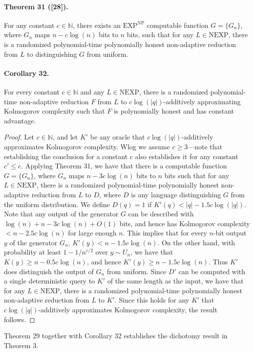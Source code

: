 \paragraph{Theorem 31 ([28]).} For any constant $c\in\mathbb N$, there exists an $\mathrm{EXP}^{\mathrm{NP}}$ computable function $G=\{G_n\}$, where $G_n$ maps $n-c\log(n)$ bits to $n$ bits, such that for any $L\in\mathrm{NEXP}$, there is a randomized polynomial-time polynomially honest non-adaptive reduction from $L$ to distinguishing $G$ from uniform.
\paragraph{Corollary 32.} For every constant $c\in\mathbb N$ and any $L\in\mathrm{NEXP}$, there is a randomized polynomial-time non-adaptive reduction $F$ from $L$ to $c\log(|q|)$-additively approximating Kolmogorov complexity such that $F$ is polynomially honest and has constant advantage.
\begin{proof}Let $c\in\mathbb N$, and let $K'$ be any oracle that $c\log(|q|)$-additively approximates Kolmogorov complexity. Wlog we assume $c\ge3$---note that establishing the conclusion for a constant $c$ also establishes it for any constant $c'\le c$. Applying Theorem 31, we have that there is a computable function $G=\{G_n\}$, where $G_n$ maps $n-3c\log(n)$ bits to $n$ bits such that for any $L\in\mathrm{NEXP}$, there is a randomized polynomial-time polynomially honest non-adaptive reduction from $L$ to $D$, where $D$ is any language distinguishing $G$ from the uniform distribution. We define $D(q)=1$ if $K'(q)<|q|-1.5c\log(|q|)$. Note that any output of the generator $G$ can be described with $\log(n)+n-3c\log(n)+O(1)$ bits, and hence has Kolmogorov complexity $<n-2.5c\log(n)$ for large enough $n$. This implies that for every $n$-bit output $y$ of the generator $G_n$, $K'(y)<n-1.5c\log(n)$. On the other hand, with probability at least $1-1/n^{c/2}$ over $y\sim U_n$, we have that $K(y)\ge n-0.5c\log(n)$, and hence $K'(y)\ge n-1.5c\log(n)$. Thus $K'$ does distinguish the output of $G_n$ from uniform. Since $D'$ can be computed with a single deterministic query to $K'$ of the same length as the input, we have that for any $L\in\mathrm{NEXP}$, there is a randomized polynomial-time polynomially honest non-adaptive reduction from $L$ to $K'$. Since this holds for any $K'$ that $c\log(|q|)$-additively approximates Kolmogorov complexity, the result follows.\end{proof}
Theorem 29 together with Corollary 32 establishes the dichotomy result in Theorem 3.
